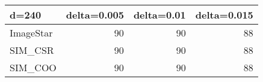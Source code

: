 \begin{tabular}{lrrr}
\hline
 d=240     &   delta=0.005 &   delta=0.01 &   delta=0.015 \\
\hline
 ImageStar &            90 &           90 &            88 \\
 SIM\_CSR   &            90 &           90 &            88 \\
 SIM\_COO   &            90 &           90 &            88 \\
\hline
\end{tabular}
